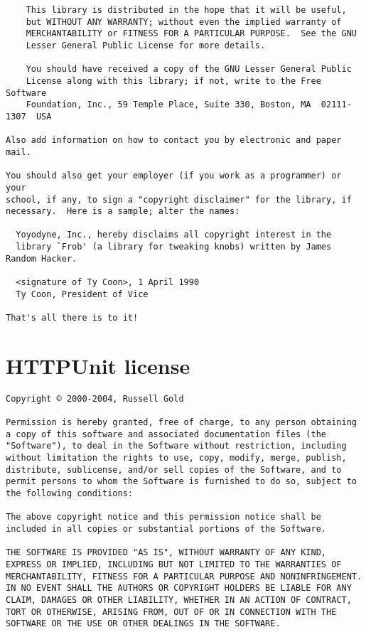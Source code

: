 \documentclass{InsightBook}
\begin{document}
\begin{verbatim}
    This library is distributed in the hope that it will be useful,
    but WITHOUT ANY WARRANTY; without even the implied warranty of
    MERCHANTABILITY or FITNESS FOR A PARTICULAR PURPOSE.  See the GNU
    Lesser General Public License for more details.

    You should have received a copy of the GNU Lesser General Public
    License along with this library; if not, write to the Free Software
    Foundation, Inc., 59 Temple Place, Suite 330, Boston, MA  02111-1307  USA

Also add information on how to contact you by electronic and paper mail.

You should also get your employer (if you work as a programmer) or your
school, if any, to sign a "copyright disclaimer" for the library, if
necessary.  Here is a sample; alter the names:

  Yoyodyne, Inc., hereby disclaims all copyright interest in the
  library `Frob' (a library for tweaking knobs) written by James Random Hacker.

  <signature of Ty Coon>, 1 April 1990
  Ty Coon, President of Vice

That's all there is to it!
\end{verbatim}


\section{HTTPUnit license}

\begin{verbatim}
Copyright © 2000-2004, Russell Gold

Permission is hereby granted, free of charge, to any person obtaining
a copy of this software and associated documentation files (the
"Software"), to deal in the Software without restriction, including
without limitation the rights to use, copy, modify, merge, publish,
distribute, sublicense, and/or sell copies of the Software, and to
permit persons to whom the Software is furnished to do so, subject to
the following conditions:

The above copyright notice and this permission notice shall be
included in all copies or substantial portions of the Software.

THE SOFTWARE IS PROVIDED "AS IS", WITHOUT WARRANTY OF ANY KIND,
EXPRESS OR IMPLIED, INCLUDING BUT NOT LIMITED TO THE WARRANTIES OF
MERCHANTABILITY, FITNESS FOR A PARTICULAR PURPOSE AND NONINFRINGEMENT.
IN NO EVENT SHALL THE AUTHORS OR COPYRIGHT HOLDERS BE LIABLE FOR ANY
CLAIM, DAMAGES OR OTHER LIABILITY, WHETHER IN AN ACTION OF CONTRACT,
TORT OR OTHERWISE, ARISING FROM, OUT OF OR IN CONNECTION WITH THE
SOFTWARE OR THE USE OR OTHER DEALINGS IN THE SOFTWARE.
\end{verbatim}
\end{document}
